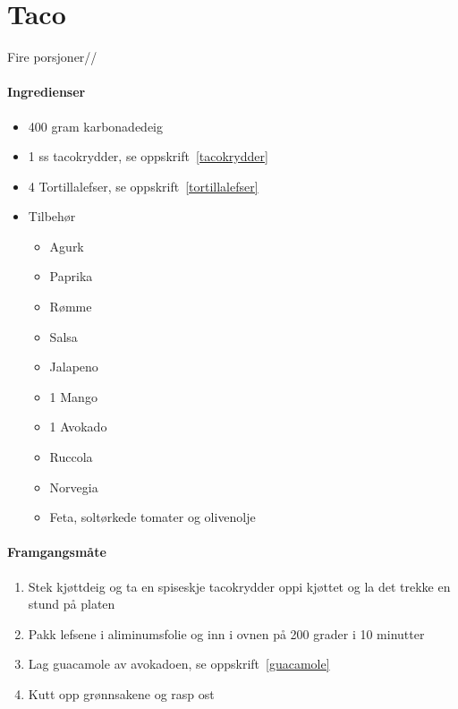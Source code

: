 \section{﻿Taco}
\label{taco}

Fire porsjoner//

\paragraph{Ingredienser}
\begin{itemize}[noitemsep]
	\item 400 gram karbonadedeig
	\item 1 ss tacokrydder, se oppskrift~\ref{tacokrydder}
	\item 4 Tortillalefser, se oppskrift~\ref{tortillalefser}
	\item Tilbehør
		\begin{itemize}[noitemsep]
			\item Agurk
			\item Paprika
			\item Rømme
			\item Salsa
			\item Jalapeno
			\item 1 Mango
			\item 1 Avokado
			\item Ruccola
			\item Norvegia
			\item Feta, soltørkede tomater og olivenolje
			\end{itemize}
\end{itemize}

\paragraph{Framgangsmåte}
\begin{enumerate}[noitemsep]
	\item Stek kjøttdeig og ta en spiseskje tacokrydder oppi kjøttet og la det trekke en stund på platen
	\item Pakk lefsene i aliminumsfolie og inn i ovnen på 200 grader i 10 minutter
	\item Lag guacamole av avokadoen, se oppskrift~\ref{guacamole}
	\item Kutt opp grønnsakene og rasp ost
\end{enumerate}

